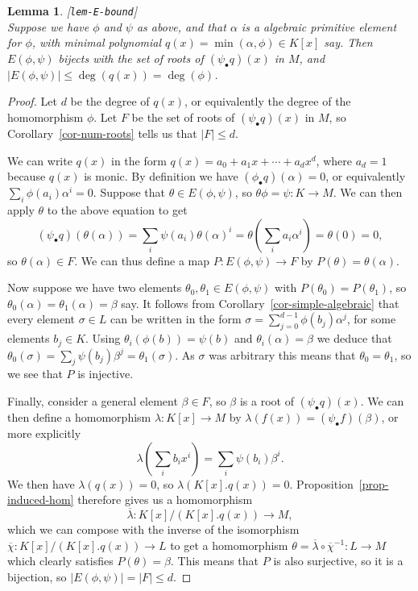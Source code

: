 \documentclass{amsart}
\newcommand{\lbl}[1]{\label{#1}\textup{[\texttt{#1}]}\ \\}
\newcommand{\lbl}{\label}
\newcommand{\al}        {\alpha}
\newcommand{\bt}        {\beta}
\newcommand{\tht}       {\theta}
\newcommand{\lm}        {\lambda}
\newcommand{\sg}        {\sigma}
\newcommand{\ov}[1]     {\overline{#1}}
\renewcommand{\:}{\colon}
\newtheorem{lemma}[theorem]{Lemma}
\theoremstyle{definition}
\begin{document}
\begin{lemma}\lbl{lem-E-bound}
 Suppose we have $\phi$ and $\psi$ as above, and that $\al$ is a
 algebraic primitive element for $\phi$, with minimal polynomial
 $q(x)=\min(\al,\phi)\in K[x]$ say.  Then $E(\phi,\psi)$ bijects with
 the set of roots of $(\psi_\bullet q)(x)$ in $M$, and
 $|E(\phi,\psi)|\leq\deg(q(x))=\deg(\phi)$. 
\end{lemma}
\begin{proof}
 Let $d$ be the degree of $q(x)$, or equivalently the degree of the
 homomorphism $\phi$.  Let $F$ be the set of roots of
 $(\psi_\bullet q)(x)$ in $M$, so Corollary~\ref{cor-num-roots} tells
 us that $|F|\leq d$.  

 We can write $q(x)$ in the form $q(x)=a_0+a_1x+\dotsb+a_dx^d$, where
 $a_d=1$ because $q(x)$ is monic.  By definition we have
 $(\phi_\bullet q)(\al)=0$, or equivalently $\sum_i\phi(a_i)\al^i=0$.
 Suppose that $\tht\in E(\phi,\psi)$, so $\tht\phi=\psi:K\to M$.  We
 can then apply $\tht$ to the above equation to get 
 \[ (\psi_\bullet q)(\tht(\al)) = \sum_i\psi(a_i)\tht(\al)^i = 
     \tht(\sum_ia_i\al^i) = \tht(0) = 0,
 \]
 so $\tht(\al)\in F$.  We can thus define a map $P\:E(\phi,\psi)\to F$
 by $P(\tht)=\tht(\al)$.  

 Now suppose we have two elements $\tht_0,\tht_1\in E(\phi,\psi)$ with
 $P(\tht_0)=P(\tht_1)$, so $\tht_0(\al)=\tht_1(\al)=\bt$ say.  It
 follows from Corollary~\ref{cor-simple-algebraic} that every element
 $\sg\in L$ can be written in the form
 $\sg=\sum_{j=0}^{d-1}\phi(b_j)\al^j$, for some elements $b_j\in K$.
 Using $\tht_i(\phi(b))=\psi(b)$ and $\tht_i(\al)=\bt$ we deduce that
 $\tht_0(\sg)=\sum_j\psi(b_j)\bt^j=\tht_1(\sg)$.  As $\sg$ was
 arbitrary this means that $\tht_0=\tht_1$, so we see that $P$ is
 injective. 

 Finally, consider a general element $\bt\in F$, so $\bt$ is a root of
 $(\psi_\bullet q)(x)$.  We can then define a homomorphism
 $\lm\:K[x]\to M$ by $\lm(f(x))=(\psi_\bullet f)(\bt)$, or more
 explicitly
 \[ \lm(\sum_ib_ix^i) = \sum_i\psi(b_i)\bt^i. \]
 We then have $\lm(q(x))=0$, so $\lm(K[x].q(x))=0$.
 Proposition~\ref{prop-induced-hom} therefore gives us a homomorphism
 \[ \ov{\lm}\:K[x]/(K[x].q(x))\to M, \]
 which we can compose with the inverse of the isomorphism
 $\ov{\chi}\:K[x]/(K[x].q(x))\to L$ to get a homomorphism
 $\tht=\ov{\lm}\circ\ov{\chi}^{-1}\:L\to M$ which clearly satisfies
 $P(\tht)=\bt$.  This means that $P$ is also surjective, so it is a
 bijection, so $|E(\phi,\psi)|=|F|\leq d$.
\end{proof}
\end{document}
